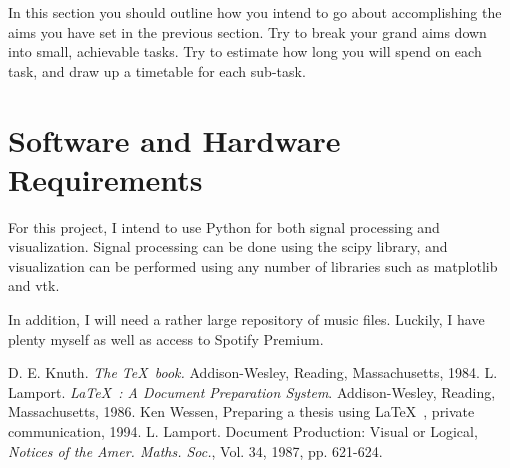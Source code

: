 \documentclass[12pt, a4paper]{article}
\begin{document}
In this section you should outline how you intend to go
about accomplishing the aims you have set in the previous
section. Try to break your grand aims down into small,
achievable tasks. Try to estimate how long you will
spend on each task, and draw up a timetable for each
sub-task.

\section*{Software and Hardware Requirements}

For this project, I intend to use Python for both signal processing and
visualization. Signal processing can be done using the scipy library, and
visualization can be performed using any number of libraries such as
matplotlib and vtk.

In addition, I will need a rather large repository of music files. Luckily,
I have plenty myself as well as access to Spotify Premium.

\begin{thebibliography}{9}
 D. E. Knuth. {\em The \TeX~book.}\/ Addison-Wesley,
Reading, Massachusetts, 1984.
 L. Lamport. {\em \LaTeX~: A Document Preparation
System}.\/ Addison-Wesley, Reading, Massachusetts, 1986.
 Ken Wessen, Preparing a thesis using \LaTeX~, private
communication, 1994.
 L. Lamport. Document Production: Visual
or Logical, {\em Notices of the Amer. Maths. Soc.},\/ Vol. 34,
1987, pp. 621-624.
\end{thebibliography}
\end{document}
